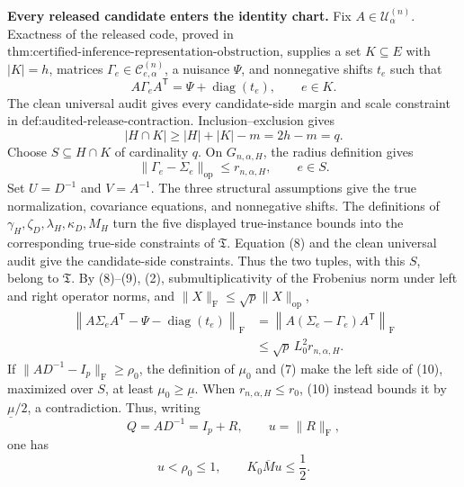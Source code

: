 \textbf{Every released candidate enters the identity chart.}
Fix \(A\in\mathcal U^{(n)}_\alpha\).  Exactness of the released code, proved in \(\text{thm:certified-inference-representation-obstruction}\), supplies a set \(K\subseteq E\) with \(|K|=h\), matrices \(\Gamma_e\in\mathcal C^{(n)}_{e,\alpha}\), a nuisance \(\Psi\), and nonnegative shifts \(t_e\) such that
\[
 A\Gamma_eA^{\mathsf T}=\Psi+\operatorname{diag}(t_e),
 \qquad e\in K.
 \tag{8}
\]
The clean universal audit gives every candidate-side margin and scale constraint in \(\text{def:audited-release-contraction}\).  Inclusion--exclusion gives
\[
 |H\cap K|\geq |H|+|K|-m=2h-m=q.
\]
Choose \(S\subseteq H\cap K\) of cardinality \(q\).  On \(G_{n,\alpha,H}\), the radius definition gives
\[
 \|\Gamma_e-\Sigma_e\|_{\mathrm{op}}\leq r_{n,\alpha,H},
 \qquad e\in S.
 \tag{9}
\]
Set \(U=D^{-1}\) and \(V=A^{-1}\).  The three structural assumptions give the true normalization, covariance equations, and nonnegative shifts.  The definitions of \(\gamma_H,\zeta_D,\lambda_H,\kappa_D,M_H\) turn the five displayed true-instance bounds into the corresponding true-side constraints of \(\mathfrak T\).  Equation (8) and the clean universal audit give the candidate-side constraints.  Thus the two tuples, with this \(S\), belong to \(\mathfrak T\).  By (8)--(9), (2), submultiplicativity of the Frobenius norm under left and right operator norms, and \(\|X\|_{\mathrm F}\leq\sqrt p\|X\|_{\mathrm{op}}\),
\[
 \begin{aligned}
 \left\|A\Sigma_eA^{\mathsf T}-\Psi-\operatorname{diag}(t_e)\right\|_{\mathrm F}
 &=\left\|A(\Sigma_e-\Gamma_e)A^{\mathsf T}\right\|_{\mathrm F}\\
 &\leq\sqrt p\,L_0^2r_{n,\alpha,H}.
 \end{aligned}
 \tag{10}
\]
If \(\|AD^{-1}-I_p\|_{\mathrm F}\geq\rho _0\), the definition of \(\mu _0\) and (7) make the left side of (10), maximized over \(S\), at least \(\mu _0\geq\underline\mu\).  When \(r_{n,\alpha,H}\leq r_0\), (10) instead bounds it by \(\underline\mu/2\), a contradiction.  Thus, writing
\[
 Q=AD^{-1}=I_p+R,
 \qquad u=\|R\|_{\mathrm F},
\]
one has
\[
 u<\rho _0\leq1,
 \qquad K_0\overline M u\leq\frac12.
 \tag{11}
\]

